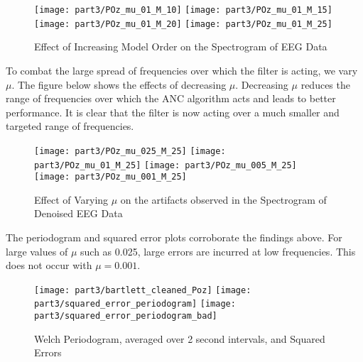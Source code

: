\begin{figure}[H]
\centering{}
\texttt{[image: part3/POz\_mu\_01\_M\_10]}
\texttt{[image: part3/POz\_mu\_01\_M\_15]}
\texttt{[image: part3/POz\_mu\_01\_M\_20]}
\texttt{[image: part3/POz\_mu\_01\_M\_25]}
\caption{Effect of Increasing Model Order on the Spectrogram of EEG Data}
\end{figure}

\noindent{}To combat the large spread of frequencies over which the filter is acting, we vary $\mu$. The figure below shows the effects of decreasing $\mu$. Decreasing $\mu$ reduces the range of frequencies over which the ANC algorithm acts and leads to better performance. It is clear that the filter is now acting over a much smaller and targeted range of frequencies. 

\begin{figure}[H]
\centering{}
\texttt{[image: part3/POz\_mu\_025\_M\_25]}
\texttt{[image: part3/POz\_mu\_01\_M\_25]}
\texttt{[image: part3/POz\_mu\_005\_M\_25]}
\texttt{[image: part3/POz\_mu\_001\_M\_25]}
\caption{Effect of Varying $\mu$ on the artifacts observed in the Spectrogram of Denoised EEG Data}
\end{figure}


\noindent{}The periodogram and squared error plots corroborate the findings above. For large values of $\mu$ such as 0.025, large errors are incurred at low frequencies. This does not occur with $\mu=0.001$.

\begin{figure}[H]
\centering{}
\texttt{[image: part3/bartlett\_cleaned\_Poz]}
\texttt{[image: part3/squared\_error\_periodogram]}
\texttt{[image: part3/squared\_error\_periodogram\_bad]}
\caption{Welch Periodogram, averaged over 2 second intervals, and Squared Errors}
\end{figure}
